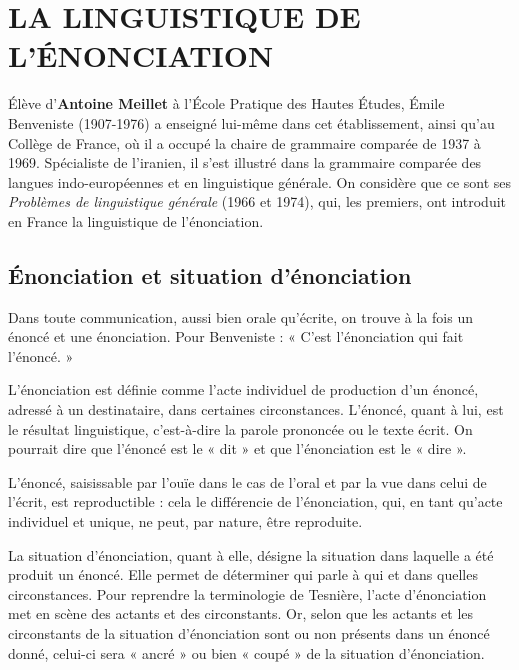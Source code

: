 \section{LA LINGUISTIQUE DE L’ÉNONCIATION}
Élève d’\textbf{Antoine Meillet} à l’École Pratique des Hautes Études, Émile Benveniste (1907-1976) a enseigné lui-même dans cet établissement, ainsi qu’au Collège de France, où il a occupé la chaire de grammaire comparée de 1937 à 1969. Spécialiste de l’iranien, il s’est illustré dans la grammaire comparée des langues indo-européennes et en linguistique générale. On considère que ce sont ses \textit{Problèmes de linguistique générale} (1966 et 1974), qui, les premiers, ont introduit en France la linguistique de l’énonciation.

\subsection{Énonciation et situation d’énonciation}
Dans toute communication, aussi bien orale qu’écrite, on trouve à la fois un énoncé et une énonciation. Pour Benveniste : « C’est l’énonciation qui fait l’énoncé. »

L’énonciation est définie comme l’acte individuel de production d’un énoncé, adressé à un destinataire, dans certaines circonstances. L’énoncé, quant à lui, est le résultat linguistique, c’est-à-dire la parole prononcée ou le texte écrit. On pourrait dire que l’énoncé est le « dit » et que l’énonciation est le « dire ».

L’énoncé, saisissable par l’ouïe dans le cas de l’oral et par la vue dans celui de l’écrit, est reproductible : cela le différencie de l’énonciation, qui, en tant qu’acte individuel et unique, ne peut, par nature, être reproduite.

La situation d’énonciation, quant à elle, désigne la situation dans laquelle a été produit un énoncé. Elle permet de déterminer qui parle à qui et dans quelles circonstances. Pour reprendre la terminologie de Tesnière, l’acte d’énonciation met en scène des actants et des circonstants. Or, selon que les actants et les circonstants de la situation d’énonciation sont ou non présents dans un énoncé donné, celui-ci sera « ancré » ou bien « coupé » de la situation d’énonciation.

